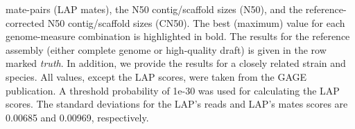 \begin{landscape}
\begin{table}[tb!]
{mate-pairs (LAP mates), the N50 contig/scaffold sizes (N50),
and the reference-corrected N50 contig/scaffold sizes (CN50).
The best (maximum) value for each
genome-measure combination is highlighted in bold.
The results for the reference
assembly (either complete genome or high-quality draft) is given in the row
marked \emph{truth}.  In addition, we
provide the results for a closely related strain and species.
All values, except the LAP scores, were taken from the
GAGE publication. A threshold probability of 1e-30 was used for calculating the LAP scores. The standard deviations for the LAP's reads and LAP's mates scores are 0.00685 and 0.00969, respectively.}
\label{tab:rhodobacter}
\end{table}
\renewcommand{\baselinestretch}{2}
\small\normalsize
\end{landscape}



